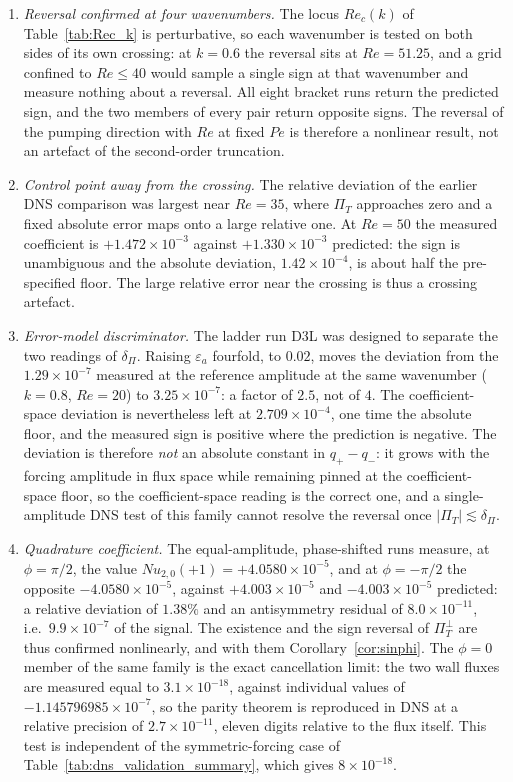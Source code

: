 \documentclass[12pt,a4paper]{article}
\newcommand{\Rey}{\mathit{Re}}
\newcommand{\Pe}{\mathit{Pe}}
\newcommand{\Nu}{\mathit{Nu}}
\newcommand{\PiT}{\Pi_T}
\begin{document}
\begin{enumerate}
\item \emph{Reversal confirmed at four wavenumbers.} The locus $\Rey_c(k)$ of
  Table~\ref{tab:Rec_k} is perturbative, so each wavenumber is tested on both sides of its own crossing: at
  $k=0.6$ the reversal sits at $\Rey=51.25$, and a grid confined to $\Rey\le40$
  would sample a single sign at that wavenumber and measure nothing about a
  reversal. All eight bracket runs return the predicted sign, and the two
  members of every pair return opposite signs. The reversal of the pumping
  direction with $\Rey$ at fixed $\Pe$ is therefore a nonlinear result, not an
  artefact of the second-order truncation.
\item \emph{Control point away from the crossing.} The relative deviation of
  the earlier DNS comparison was largest near $\Rey=35$, where $\PiT$ approaches
  zero and a fixed absolute error maps onto a large relative one. At $\Rey=50$
  the measured coefficient is $+1.472\times10^{-3}$ against
  $+1.330\times10^{-3}$ predicted: the sign is unambiguous and the absolute
  deviation, $1.42\times10^{-4}$, is about half the pre-specified floor. The
  large relative error near the crossing is thus a crossing artefact.
\item \emph{Error-model discriminator.} The ladder run D3L was designed to
  separate the two readings of $\delta_\Pi$. Raising $\varepsilon_a$ fourfold, to $0.02$, moves the deviation from the
  $1.29\times10^{-7}$ measured at the reference amplitude at the same wavenumber
  ($k=0.8$, $\Rey=20$) to $3.25\times10^{-7}$: a factor of
  $2.5$, not of $4$. The coefficient-space deviation is nevertheless left at
  $2.709\times10^{-4}$, one time the absolute floor, and the measured sign is
  positive where the prediction is negative. The deviation is
  therefore \emph{not} an absolute constant in $q_+-q_-$: it grows with the
  forcing amplitude in flux space while remaining pinned at the coefficient-space
  floor, so the coefficient-space reading is the correct one, and a
  single-amplitude DNS test of this family cannot resolve the reversal once
  $|\PiT|\lesssim\delta_\Pi$.
\item \emph{Quadrature coefficient.} The equal-amplitude, phase-shifted runs
  measure, at $\phi=\pi/2$, the value $\Nu_{2,0}(+1)=+4.0580\times10^{-5}$, and at
  $\phi=-\pi/2$ the opposite $-4.0580\times10^{-5}$, against $+4.003\times10^{-5}$ and
  $-4.003\times10^{-5}$ predicted: a relative deviation of $1.38\%$ and an
  antisymmetry residual of $8.0\times10^{-11}$, i.e.\ $9.9\times10^{-7}$ of the
  signal. The existence and the sign reversal of $\PiT^{\perp}$ are thus
  confirmed nonlinearly, and with them Corollary~\ref{cor:sinphi}. The
  $\phi=0$ member of the same family is the exact cancellation limit: the two
  wall fluxes are measured equal to $3.1\times10^{-18}$, against individual
  values of $-1.145796985\times10^{-7}$, so the parity theorem is reproduced in
  DNS at a relative precision of $2.7\times10^{-11}$, eleven digits relative to
  the flux itself. This test is independent of the symmetric-forcing case of
  Table~\ref{tab:dns_validation_summary}, which gives $8\times10^{-18}$.
\end{enumerate}
\end{document}
